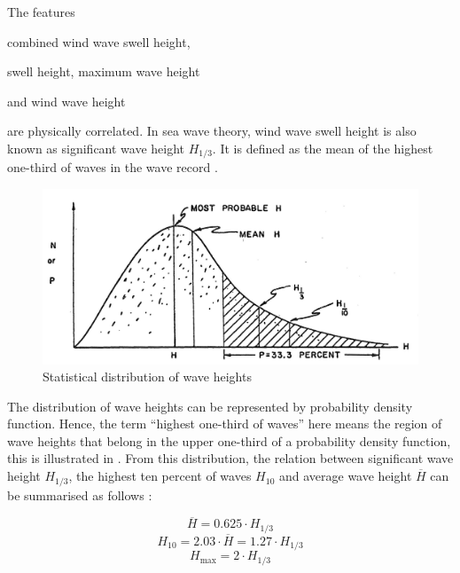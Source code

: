 The features \begin{enumerate*}[label={(\arabic*)}]
\item combined wind wave swell height, 
\item swell height, maximum wave height 
\item and wind wave height \end{enumerate*} are physically correlated. In sea wave theory, wind wave swell height is also known as significant wave height $H_{1/3}$. It is defined as the mean of the highest one-third of waves in the wave record \cite{Holthuijsen.2007}. \\

\begin{figure}
    \centering
        \includegraphics[width=.85\textwidth]{02_figures/Bretschneider_1965_wavedist.jpg}
        \caption{Statistical distribution of wave heights \cite{bretschneider.1965}}
        \label{fig:wavestats}
\end{figure}

The distribution of wave heights can be represented by probability density function. Hence, the term ``highest one-third of waves'' here means the region of wave heights that belong in the upper one-third of a probability density function, this is illustrated in . From this distribution, the relation between significant wave height $H_{1/3}$, the highest ten percent of waves $H_{10}$ and average wave height $\overline{H}$ can be summarised as follows \cite{bretschneider.1965,Holthuijsen.2007}: 

\begin{equation}\label{eqn:Hsig_mean}
    \overline{H} = 0.625\cdot H_{1/3}
\end{equation}
\begin{equation}\label{eqn:Hsig_Hten}
    H_{10} = 2.03\cdot \overline{H} = 1.27\cdot H_{1/3} 
\end{equation}
\begin{equation}\label{eqn:Hsig_max}
    H_{\text{max}} = 2 \cdot H_{1/3} 
\end{equation} 

